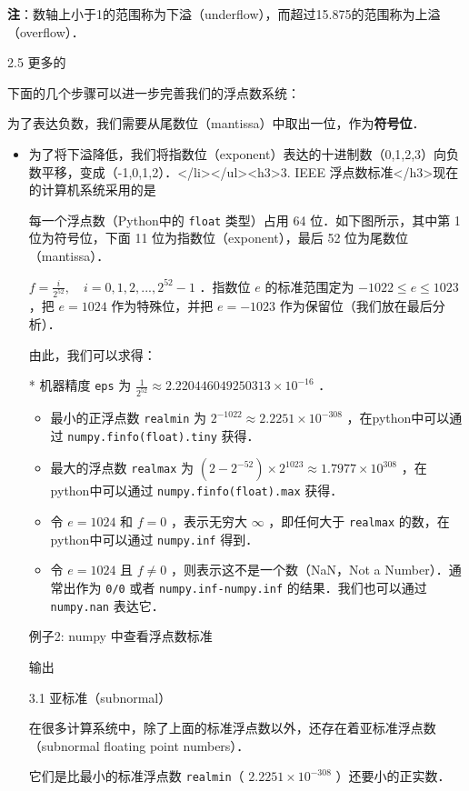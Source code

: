 \textbf{注}：数轴上小于1的范围称为下溢（underflow），而超过15.875的范围称为上溢（overflow）．

2.5 更多的

下面的几个步骤可以进一步完善我们的浮点数系统：

为了表达负数，我们需要从尾数位（mantissa）中取出一位，作为\textbf{符号位}． 

\begin{itemize}
\item 为了将下溢降低，我们将指数位（exponent）表达的十进制数（0,1,2,3）向负数平移，变成（-1,0,1,2）．</li></ul><h3>3. IEEE 浮点数标准</h3>现在的计算机系统采用的是

每一个浮点数（Python中的 \verb|float| 类型）占用 64 位．如下图所示，其中第 1 位为符号位，下面 11 位为指数位（exponent），最后 52 位为尾数位（mantissa）．

$f=\frac{i}{2^{52}},\quad i=0,1,2,...,2^{52}-1$  ．指数位  $e$  的标准范围定为  $-1022\le e\le 1023$  ，把  $e=1024$  作为特殊位，并把  $e=-1023$  作为保留位（我们放在最后分析）．

由此，我们可以求得：

* 机器精度 \verb|eps| 为  $\frac{1}{2^{52}}\approx 2.220446049250313\times10^{-16}$  ．

\begin{itemize}
\item 最小的正浮点数 \verb|realmin| 为  $2^{-1022}\approx2.2251\times10^{-308}$  ，在python中可以通过 \verb|numpy.finfo(float).tiny| 获得．
\item 最大的浮点数 \verb|realmax| 为 $(2-2^{-52})\times2^{1023}\approx1.7977\times10^{308}$  ，在python中可以通过 \verb|numpy.finfo(float).max| 获得．
\item 令  $e=1024$  和  $f=0$  ，表示无穷大  $\infty$  ，即任何大于 \verb|realmax| 的数，在python中可以通过 \verb|numpy.inf| 得到．
\item 令  $e=1024$  且  $f\neq0$  ，则表示这不是一个数（NaN，Not a Number）．通常出作为 \verb|0/0| 或者 \verb|numpy.inf-numpy.inf| 的结果．我们也可以通过 \verb|numpy.nan| 表达它．
\end{itemize}

例子2: numpy 中查看浮点数标准

输出

3.1 亚标准（subnormal）

在很多计算系统中，除了上面的标准浮点数以外，还存在着亚标准浮点数（subnormal floating point numbers）． 

它们是比最小的标准浮点数 \verb|realmin|（  $2.2251\times10^{-308}$  ）还要小的正实数．


\end{itemize}
